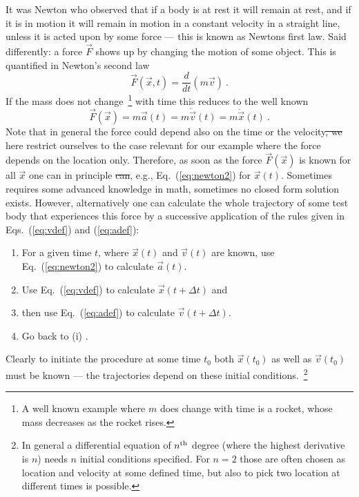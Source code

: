 \documentclass[12pt]{iopart}
\providecommand{\DIFadd}[1]{{\protect\color{blue}\uwave{#1}}} %
\providecommand{\DIFdel}[1]{{\protect\color{red}\sout{#1}}}                      %
\providecommand{\DIFaddbegin}{} %
\providecommand{\DIFaddend}{} %
\providecommand{\DIFdelbegin}{} %
\providecommand{\DIFdelend}{} %
\newcommand{\DIFscaledelfig}{0.5}
\newlength{\DIFdelgraphicswidth} %
\newlength{\DIFdelgraphicsheight} %
\newcommand{\DIFaddincludegraphics}[2][]{{\color{blue}\fbox{\DIFOincludegraphics[#1]{#2}}}} %
\newcommand{\DIFdelincludegraphics}[2][]{%
\sbox{\DIFdelgraphicsbox}{\DIFOincludegraphics[#1]{#2}}%
\settoboxwidth{\DIFdelgraphicswidth}{\DIFdelgraphicsbox} %
\settoboxtotalheight{\DIFdelgraphicsheight}{\DIFdelgraphicsbox} %
\scalebox{\DIFscaledelfig}{%
\parbox[b]{\DIFdelgraphicswidth}{\usebox{\DIFdelgraphicsbox}\\[-\baselineskip] \rule{\DIFdelgraphicswidth}{0em}}\llap{\resizebox{\DIFdelgraphicswidth}{\DIFdelgraphicsheight}{%
\setlength{\unitlength}{\DIFdelgraphicswidth}%
\begin{picture}(1,1)%
\thicklines\linethickness{2pt} %
{\color[rgb]{1,0,0}\put(0,0){\framebox(1,1){}}}%
{\color[rgb]{1,0,0}\put(0,0){\line( 1,1){1}}}%
{\color[rgb]{1,0,0}\put(0,1){\line(1,-1){1}}}%
\end{picture}%
}\hspace*{3pt}}} %
} %
\DeclareRobustCommand{\DIFaddbegin}{\DIFOaddbegin \let\includegraphics\DIFaddincludegraphics} %
\DeclareRobustCommand{\DIFaddend}{\DIFOaddend \let\includegraphics\DIFOincludegraphics} %
\DeclareRobustCommand{\DIFdelbegin}{\DIFOdelbegin \let\includegraphics\DIFdelincludegraphics} %
\DeclareRobustCommand{\DIFdelend}{\DIFOaddend \let\includegraphics\DIFOincludegraphics} %
\begin{document}
It was Newton who observed that if a body is at rest it will remain at rest, and if it is in motion it will remain in motion in a 
constant velocity in a straight line, unless it is acted upon by some force --- this is known as Newtons first law. 
Said differently: a force $\vec F$ shows up by changing the motion of some object. This is quantified in Newton's second law
\begin{equation}
\vec F(\vec x, t) = \frac{d}{dt}(m \vec v) \ .
\end{equation} 
If the mass does not change~\footnote{A well known example where $m$ does change with time is a 
rocket, whose mass decreases as the rocket rises.} with time this reduces to the well known
\begin{equation}
\vec F(\vec x) = m \vec a(t) = m\dot{\vec v}(t) = m\ddot{\vec{x}}(t) \ . \label{eq:newton2}
\end{equation} 
Note that in general the force could depend also on the time or the velocity\DIFdelbegin \DIFdel{, we }\DIFdelend \DIFaddbegin \DIFadd{. We }\DIFaddend here restrict ourselves to the
case relevant for our example where the force depends on the location only. 
Therefore, 
as soon as the force $\vec F(\vec x)$ is known for all $\vec x$ one can in principle \DIFdelbegin \DIFdel{can}\DIFdelend \DIFaddbegin \DIFadd{solve}\DIFaddend , e.g., Eq.~(\ref{eq:newton2})
for $\vec x(t)$.
Sometimes \DIFaddbegin \DIFadd{this }\DIFaddend requires some advanced knowledge in math, sometimes no closed form solution exists. However, alternatively 
one can calculate the whole trajectory
of some test body that experiences this force by a successive application of the rules 
given in Eqs.~(\ref{eq:vdef}) and (\ref{eq:adef}):
\begin{enumerate}
\item For a given time $t$, where $\vec x(t)$ and $\vec v(t)$ are known, use Eq.~(\ref{eq:newton2}) to calculate $\vec a(t)$.
\item Use Eq.~(\ref{eq:vdef}) to calculate $\vec x(t+\Delta t)$ and
\item then use Eq.~(\ref{eq:adef}) to calculate $\vec v(t+\Delta t)$.
\item Go back to (i) \DIFaddbegin \DIFadd{with $t\to t+\Delta t$}\DIFaddend .
\end{enumerate}
Clearly to initiate the procedure at some time $t_0$ both $\vec x(t_0)$ as well as $\vec v(t_0)$ must be known --- the 
trajectories depend on these initial conditions.~\footnote{In general a differential equation of $n^{\rm th}$ degree (where
the highest derivative is $n$) needs $n$ initial conditions specified. For $n=2$ those are often chosen as location and velocity
at some defined time, but also to pick two location at different times is possible. }
\end{document}
